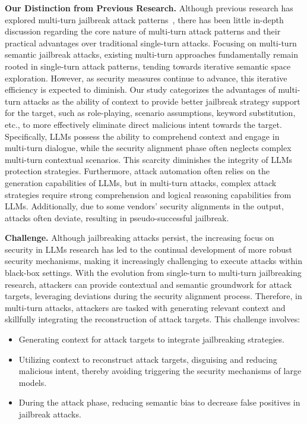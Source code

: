 \textbf{Our Distinction from Previous Research.} Although previous research has explored multi-turn jailbreak attack patterns~\cite{chao2023jailbreaking,zhou2024speak,bhardwaj2023red}, there has been little in-depth discussion regarding the core nature of multi-turn attack patterns and their practical advantages over traditional single-turn attacks. Focusing on multi-turn semantic jailbreak attacks, existing multi-turn approaches fundamentally remain rooted in single-turn attack patterns, tending towards iterative semantic space exploration. However, as security measures continue to advance, this iterative efficiency is expected to diminish. Our study categorizes the advantages of multi-turn attacks as the ability of context to provide better jailbreak strategy support for the target, such as role-playing, scenario assumptions, keyword substitution, etc., to more effectively eliminate direct malicious intent towards the target. Specifically, LLMs possess the ability to comprehend context and engage in multi-turn dialogue, while the security alignment phase often neglects complex multi-turn contextual scenarios. This scarcity diminishes the integrity of LLMs protection strategies. Furthermore, attack automation often relies on the generation capabilities of LLMs, but in multi-turn attacks, complex attack strategies require strong comprehension and logical reasoning capabilities from LLMs. Additionally, due to some vendors’ security alignments in the output, attacks often deviate, resulting in pseudo-successful jailbreak.


\textbf{Challenge.} Although jailbreaking attacks persist, the increasing focus on security in LLMs research has led to the continual development of more robust security mechanisms, making it increasingly challenging to execute attacks within black-box settings. With the evolution from single-turn to multi-turn jailbreaking research, attackers can provide contextual and semantic groundwork for attack targets, leveraging deviations during the security alignment process. Therefore, in multi-turn attacks, attackers are tasked with generating relevant context and skillfully integrating the reconstruction of attack targets. This challenge involves:

\begin{itemize}
    \item Generating context for attack targets to integrate jailbreaking strategies.

	\item Utilizing context to reconstruct attack targets, disguising and reducing malicious intent, thereby avoiding triggering the security mechanisms of large models.
	
	\item During the attack phase, reducing semantic bias to decrease false positives in jailbreak attacks.
\end{itemize}


